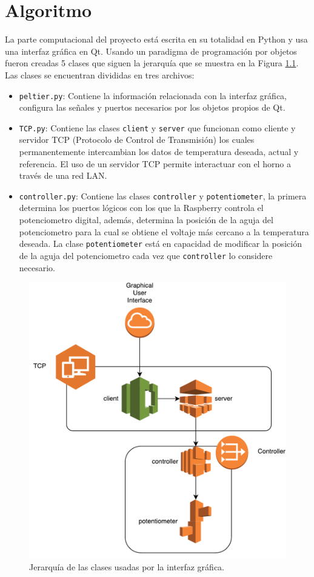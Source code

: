 \documentclass{wileysix}
\begin{document}
\chapter{Algoritmo}
La parte computacional del proyecto est\'a escrita en su totalidad en Python y usa una interfaz gr\'afica en Qt. Usando un paradigma de programaci\'on por objetos fueron creadas 5 clases que siguen la jerarqu\'ia que se muestra en la Figura \ref{fig: diagram}. Las clases se encuentran divididas en tres archivos:
\begin{itemize}
	\item \verb|peltier.py|: Contiene la informaci\'on relacionada con la interfaz gr\'afica, configura las se\~nales y puertos necesarios por los objetos propios de Qt.
	
	\item \verb|TCP.py|: Contiene las clases \verb|client| y \verb|server| que funcionan como cliente y servidor TCP (Protocolo de Control de Transmisi\'on) los cuales permanentemente intercambian los datos de temperatura deseada, actual y referencia. El uso de un servidor TCP permite interactuar con el horno a trav\'es de una red LAN.
	\item \verb|controller.py|: Contiene las clases \verb|controller| y \verb|potentiometer|, la primera determina los puertos l\'ogicos con los que la Raspberry controla el potenciometro digital, adem\'as, determina la posici\'on de la aguja del potenciometro para la cual se obtiene el voltaje m\'as cercano a la temperatura deseada. La clase \verb|potentiometer| est\'a en capacidad de modificar la posici\'on de la aguja del potenciometro cada vez que \verb|controller| lo considere necesario.
\end{itemize}
\begin{figure}[h]
	\centering
	\includegraphics[width=0.7\linewidth]{extras/diagram.pdf}
	\caption{Jerarqu\'ia de las clases usadas por la interfaz gr\'afica.}
	\label{fig: diagram}
\end{figure} 
\end{document}
